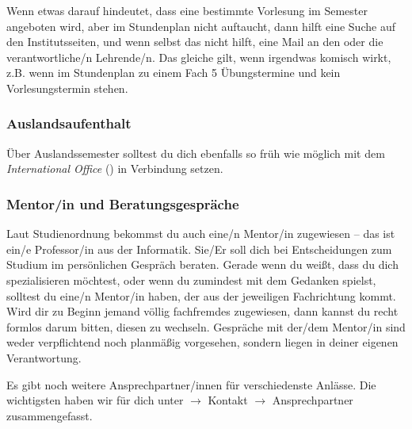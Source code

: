 	Wenn etwas darauf hindeutet, dass eine bestimmte Vorlesung im Semester angeboten wird, aber im Stundenplan nicht auftaucht, dann hilft eine Suche auf den Institutsseiten, und wenn selbst das nicht hilft, eine Mail an den oder die verantwortliche/n Lehrende/n. Das gleiche gilt, wenn irgendwas komisch wirkt, z.B. wenn im Stundenplan zu einem Fach 5 Übungstermine und kein Vorlesungstermin stehen.

\subsubsection{Auslandsaufenthalt}
	Über Auslandssemester solltest du dich ebenfalls so früh wie möglich mit dem \emph{International Office} () in Verbindung setzen.

\subsubsection{Mentor/in und Beratungsgespräche}
	Laut Studienordnung bekommst du auch eine/n Mentor/in zugewiesen -- das ist ein/e Professor/in aus der Informatik. Sie/Er soll dich bei Entscheidungen zum Studium im persönlichen Gespräch beraten. Gerade wenn du weißt, dass du dich spezialisieren möchtest, oder wenn du zumindest mit dem Gedanken spielst, solltest du eine/n Mentor/in haben, der aus der jeweiligen Fachrichtung kommt. Wird dir zu Beginn jemand völlig fachfremdes zugewiesen, dann kannst du recht formlos darum bitten, diesen zu wechseln. Gespräche mit der/dem Mentor/in sind weder verpflichtend noch planmäßig vorgesehen, sondern liegen in deiner eigenen Verantwortung.

Es gibt  noch weitere Ansprechpartner/innen für verschiedenste Anlässe. Die wichtigsten haben wir für dich unter  \fginfoUrl $\rightarrow$ Kontakt $\rightarrow$ Ansprechpartner zusammengefasst.
